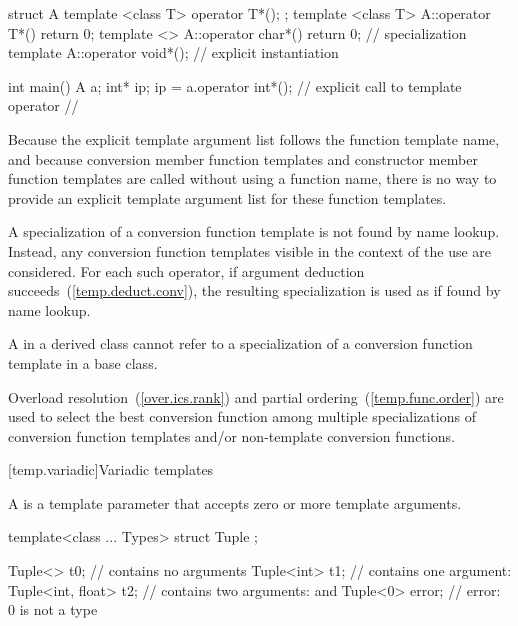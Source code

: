 \begin{codeblock}
struct A {
  template <class T> operator T*();
};
template <class T> A::operator T*(){ return 0; }
template <> A::operator char*(){ return 0; }    // specialization
template A::operator void*();                   // explicit instantiation

int main() {
  A a;
  int* ip;
  ip = a.operator int*();       // explicit call to template operator
                                // 
}
\end{codeblock}
\exitexample
\enternote
Because the explicit template argument list follows the function template
name, and because conversion member function templates and constructor
member function templates are called without using a function name,
there is no way to provide an explicit template argument list for these
function templates.
\exitnote

\pnum
A specialization of a
conversion function template
is not found by name
lookup.
Instead, any
conversion function templates
visible in the
context of the use are considered.
For each such operator, if argument
deduction succeeds~(\ref{temp.deduct.conv}), the resulting specialization is
used as if found by name lookup.

\pnum
A  in a derived class cannot refer to a specialization
of a
conversion function template
in a base class.

\pnum
Overload resolution~(\ref{over.ics.rank}) and partial
ordering~(\ref{temp.func.order}) are used to select the best conversion function
among multiple
specializations of conversion function templates
and/or non-template
conversion functions.

[temp.variadic]{Variadic templates}

\pnum
A  is a template parameter
that accepts zero or more template arguments. \enterexample

\begin{codeblock}
template<class ... Types> struct Tuple { };

Tuple<> t0;                     //  contains no arguments
Tuple<int> t1;                  //  contains one argument: 
Tuple<int, float> t2;           //  contains two arguments:  and 
Tuple<0> error;                 // error: 0 is not a type
\end{codeblock}

\exitexample

